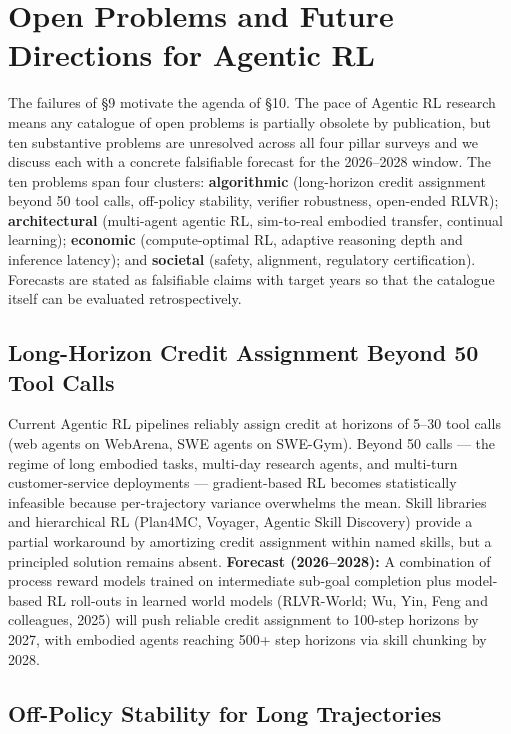 \documentclass{article}
\begin{document}
\section{Open Problems and Future Directions for Agentic RL}\label{open-problems-and-future-directions-for-agentic-rl}

The failures of §9 motivate the agenda of §10. The pace of Agentic RL research means any catalogue of open problems is partially obsolete by publication, but ten substantive problems are unresolved across all four pillar surveys \citep{zhang20252025} and we discuss each with a concrete falsifiable forecast for the 2026--2028 window. The ten problems span four clusters: \textbf{algorithmic} (long-horizon credit assignment beyond 50 tool calls, off-policy stability, verifier robustness, open-ended RLVR); \textbf{architectural} (multi-agent agentic RL, sim-to-real embodied transfer, continual learning); \textbf{economic} (compute-optimal RL, adaptive reasoning depth and inference latency); and \textbf{societal} (safety, alignment, regulatory certification). Forecasts are stated as falsifiable claims with target years so that the catalogue itself can be evaluated retrospectively.

\subsection{Long-Horizon Credit Assignment Beyond 50 Tool Calls}\label{long-horizon-credit-assignment-beyond-50-tool-calls}

Current Agentic RL pipelines reliably assign credit at horizons of 5--30 tool calls (web agents on WebArena, SWE agents on SWE-Gym). Beyond 50 calls --- the regime of long embodied tasks, multi-day research agents, and multi-turn customer-service deployments --- gradient-based RL becomes statistically infeasible because per-trajectory variance overwhelms the mean. Skill libraries and hierarchical RL (Plan4MC, Voyager, Agentic Skill Discovery) provide a partial workaround by amortizing credit assignment within named skills, but a principled solution remains absent. \textbf{Forecast (2026--2028):} A combination of process reward models trained on intermediate sub-goal completion plus model-based RL roll-outs in learned world models (RLVR-World; Wu, Yin, Feng and colleagues, 2025) will push reliable credit assignment to 100-step horizons by 2027, with embodied agents reaching 500+ step horizons via skill chunking by 2028.

\subsection{Off-Policy Stability for Long Trajectories}\label{off-policy-stability-for-long-trajectories}
\end{document}
